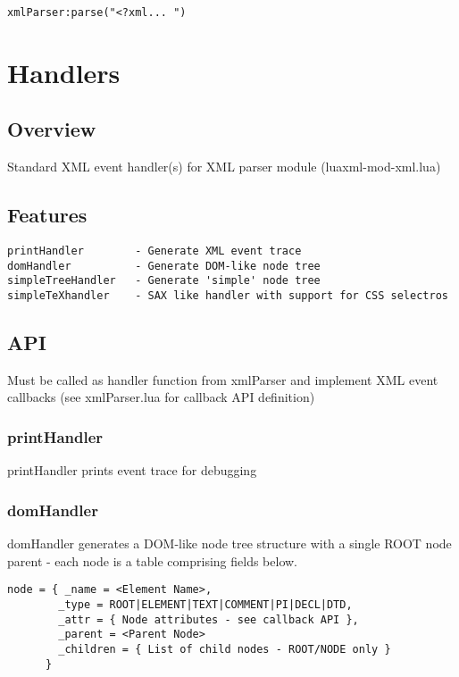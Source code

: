 \documentclass{ltxdoc}
\begin{document}
\begin{verbatim}
xmlParser:parse("<?xml... ")
\end{verbatim}
\section{Handlers}\label{sec:handlers}

\subsection{Overview}

Standard XML event handler(s) for XML parser module (luaxml-mod-xml.lua)

\subsection{Features}

\begin{verbatim}
printHandler        - Generate XML event trace
domHandler          - Generate DOM-like node tree
simpleTreeHandler   - Generate 'simple' node tree
simpleTeXhandler    - SAX like handler with support for CSS selectros
\end{verbatim}
\subsection{API}

Must be called as handler function from xmlParser and implement XML
event callbacks (see xmlParser.lua for callback API definition)

\subsubsection{printHandler}

printHandler prints event trace for debugging

\subsubsection{domHandler}

domHandler generates a DOM-like node tree  structure with 
a single ROOT node parent - each node is a table comprising 
fields below.

\begin{verbatim}
node = { _name = <Element Name>,
        _type = ROOT|ELEMENT|TEXT|COMMENT|PI|DECL|DTD,
        _attr = { Node attributes - see callback API },
        _parent = <Parent Node>
        _children = { List of child nodes - ROOT/NODE only }
      }

\end{verbatim}
\end{document}

